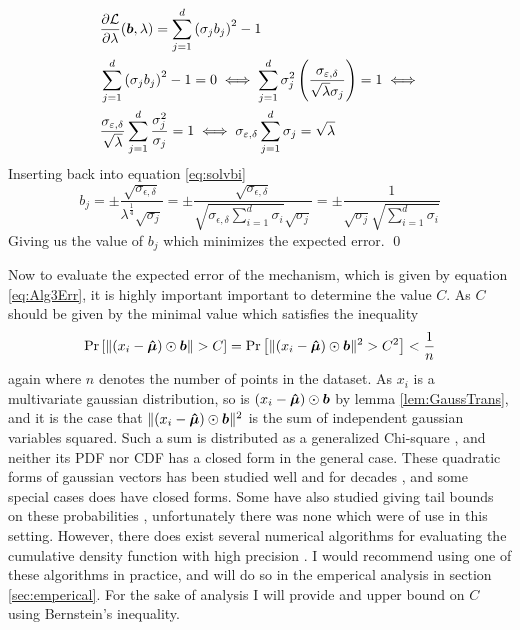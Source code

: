 \documentclass[a4paper,12pt]{article}
\renewenvironment{proof}{{\textit{Proof} \\}}{\qed}
\begin{document}
\begin{proof}
\begin{align*}
    &\frac{\partial \mathcal{L}}{\partial \lambda}(\bm{b},\lambda) = 
    \sum_{j=1}^d \left ( \sigma_j b_j\right)^2 - 1 \\
    &\sum_{j=1}^d \left ( \sigma_j b_j\right)^2 - 1 = 0 \iff
    \sum_{j=1}^d \sigma_j^2 \left ( \frac{\sigma_{\varepsilon,\delta}}{\sqrt{\lambda}\sigma_j}\right) = 1 \iff \\
    &\frac{\sigma_{\varepsilon,\delta}}{\sqrt{\lambda}} \sum_{j=1}^d \frac{\sigma_j^2}{\sigma_j} = 1 \iff
    \sigma_{\varepsilon,\delta} \sum_{j=1}^d \sigma_j = \sqrt{\lambda}
\end{align*}
Inserting back into equation \eqref{eq:solvbi}
\[
    b_j = \pm \frac{\sqrt{\sigma_{\epsilon,\delta}}}{\lambda^{\frac{1}{4}} \sqrt{\sigma_j}} =
    \pm \frac{\sqrt{\sigma_{\epsilon,\delta}}}{\sqrt{\sigma_{\epsilon,\delta} \sum_{i=1}^d \sigma_i} \sqrt{\sigma_j}} = 
    \pm \frac{1}{\sqrt{\sigma_j} \sqrt{\sum_{i=1}^d \sigma_i} } 
\]
Giving us the value of $b_j$ which minimizes the expected error.
\end{proof}

Now to evaluate the expected error of the mechanism, which is given by equation \eqref{eq:Alg3Err}, it is highly important important to determine the value $C$.
As $C$ should be given by the minimal value which satisfies the inequality
\[
   \Pr\left [ \| (x_i - \bm{\hat{\mu}}) \odot \bm{b} \| > C  \right] = \Pr\left [ \| (x_i - \bm{\hat{\mu}}) \odot \bm{b} \|^2 > C^2 \right] < \frac{1}{n}
\]
again where $n$ denotes the number of points in the dataset.
As $x_i$ is a multivariate gaussian distribution, so is $(x_i - \bm{\hat{\mu}}) \odot \bm{b}$ by lemma \ref{lem:GaussTrans},
and it is the case that $\|(x_i - \bm{\hat{\mu}}) \odot \bm{b}\|^2$ is the sum of independent gaussian variables squared.
Such a sum is distributed as a generalized Chi-square \cite{GenChiSq}, and neither its PDF nor CDF has a closed form in the general case.
These quadratic forms of gaussian vectors has been studied well and for decades \cite{MathaiQaudForms,IowaQuadNormForms}, and some special cases does have closed forms.
Some have also studied giving tail bounds on these probabilities \cite{QaudFormsBounds}, unfortunately there was none which were of use in this setting.
However, there does exist several numerical algorithms for evaluating the cumulative density function with high precision \cite{QuadFormsNume}. 
I would recommend using one of these algorithms in practice, and will do so in the emperical analysis in section \ref{sec:emperical}.
For the sake of analysis I will provide and upper bound on $C$ using Bernstein's inequality.
\end{document}
